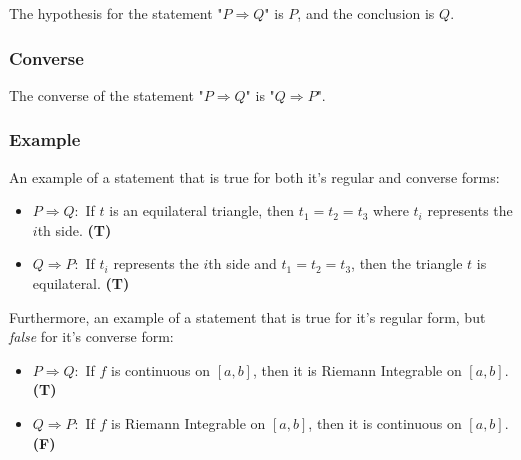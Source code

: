 \documentclass{article}
\begin{document}
The hypothesis for the statement "$P \Rightarrow Q$" is $P$, and the conclusion is $Q$.

\subsubsection{Converse}

The converse of the statement "$P \Rightarrow Q$" is "$Q \Rightarrow P$".

\subsubsection{Example}

An example of a statement that is true for both it's regular and converse forms:

\begin{itemize}
    \item $P \Rightarrow Q:$ If $t$ is an equilateral triangle, then $t_1 = t_2 = t_3$ where $t_i$ represents the $i$th side. \textbf{(T)}
    \item $Q \Rightarrow P:$ If $t_i$ represents the $i$th side and $t_1 = t_2 = t_3$, then the triangle $t$ is equilateral. \textbf{(T)}
\end{itemize}

Furthermore, an example of a statement that is true for it's regular form, but \textit{false} for it's converse form:

\begin{itemize}
    \item $P \Rightarrow Q:$ If $f$ is continuous on $[a, b]$, then it is Riemann Integrable on $[a, b]$. \textbf{(T)}
    \item $Q \Rightarrow P:$ If $f$ is Riemann Integrable on $[a, b]$, then it is continuous on $[a, b]$. \textbf{(F)}
\end{itemize}
\end{document}
